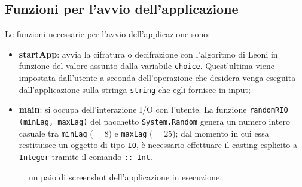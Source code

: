 \documentclass[a4paper, 12pt, one column, aas_macros]{article}
\begin{document}
	\subsection{Funzioni per l'avvio dell'applicazione}
	Le funzioni necessarie per l'avvio dell'applicazione sono:
	\begin{itemize}
		\item \textbf{startApp}: avvia la cifratura o decifrazione con l'algoritmo di Leoni in funzione del valore assunto dalla variabile \verb|choice|. Quest'ultima viene impostata dall'utente a seconda dell'operazione che desidera venga eseguita dall'applicazione sulla stringa \verb|string| che egli fornisce in input;
	
		\item \textbf{main}: si occupa dell'interazione I/O con l'utente. La funzione \verb|randomRIO (minLag, maxLag)| del pacchetto \verb|System.Random| genera un numero intero casuale tra \verb|minLag| ($=8$) e \verb|maxLag| ($=25$); dal momento in cui essa restituisce un oggetto di tipo \verb|IO|, è necessario effettuare il casting esplicito a \verb|Integer| tramite il comando \verb|:: Int|.
	\end{itemize}
	\begin{figure}[h!]
		\centering
		\caption[]{un paio di screenshot dell'applicazione in esecuzione.}
		\label{App_screens}
	\end{figure}
\end{document}
